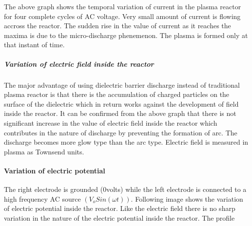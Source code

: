 \documentclass[11pt]{article}
\begin{document}
The above graph shows the temporal variation of current in the plasma
reactor for four complete cycles of AC voltage. Very small amount of
current is flowing accross the reactor. The sudden rise in the value of
current as it reaches the maxima is due to the micro-discharge
phenemenon. The plasma is formed only at that instant of time.

\subparagraph{Variation of electric field inside the
reactor}\label{variation-of-electric-field-inside-the-reactor}

The major advantage of using dielectric barrier discharge instead of
traditional plasma reactor is that there is the accumulation of charged
particles on the surface of the dielectric which in return works against
the development of field inside the reactor. It can be confirmed from
the above graph that there is not significant increase in the value of
electric field inside the reactor which contributes in the nature of
discharge by preventing the formation of arc. The discharge becomes more
glow type than the arc type. Electric field is measured in plasma as
Townsend units.

    \paragraph{Variation of electric
potential}\label{variation-of-electric-potential}

The right electrode is grounded (0volts) while the left electrode is
connected to a high frequency AC source \((V_o Sin(\omega t))\).
Following image shows the variation of electric potential inside the
reactor. Like the electric field there is no sharp variation in the
nature of the electric potential inside the reactor. The profile


    
    
    
    
\end{document}
